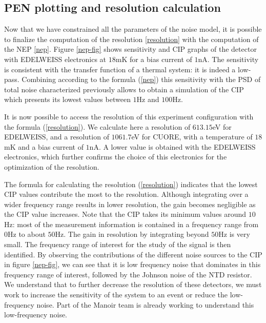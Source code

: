 \subsection{PEN plotting and resolution calculation}
\label{nep-res}

Now that we have constrained all the parameters of the noise model, it is possible to finalize the computation of the resolution \ref{resolution} with the computation of the NEP \ref{nep}. Figure \ref{nep-fig} shows sensitivity and CIP graphs of the detector with EDELWEISS electronics at $18$mK for a bias current of $1$nA. The sensitivity is consistent with the transfer function of a thermal system: it is indeed a low-pass. Combining according to the formula (\ref{nep}) this sensitivity with the PSD of total noise characterized previously allows to obtain a simulation of the CIP which presents its lowest values between $1$Hz and $100$Hz. 

It is now possible to access the resolution of this experiment configuration with the formula (\ref{resolution}). We calculate here a resolution of $613.15$eV for EDELWEISS, and a resolution of $1061.7$eV for CUORE, with a temperature of $18$mK and a bias current of $1$nA. A lower value is obtained with the EDELWEISS electronics, which further confirms the choice of this electronics for the optimization of the resolution.

The formula for calculating the resolution (\ref{resolution}) indicates that the lowest CIP values contribute the most to the resolution. Although integrating over a wider frequency range results in lower resolution, the gain becomes negligible as the CIP value increases.
Note that the CIP takes its minimum values around $10$Hz: most of the measurement information is contained in a frequency range from $0$Hz to about $50$Hz. The gain in resolution by integrating beyond $50$Hz is very small. The frequency range of interest for the study of the signal is then identified. By observing the contributions of the different noise sources to the CIP in figure \ref{nep-fig}, we can see that it is low frequency noise that dominates in this frequency range of interest, followed by the Johnson noise of the NTD resistor. We understand that to further decrease the resolution of these detectors, we must work to increase the sensitivity of the system to an event or reduce the low-frequency noise. Part of the Manoir team is already working to understand this low-frequency noise.

